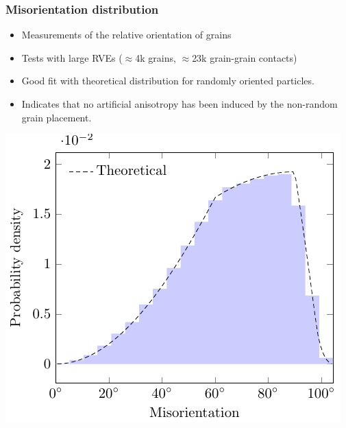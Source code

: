 \documentclass[11pt]{beamer} %
\begin{document}
\begin{frame}
 \frametitle{Misorientation distribution}
  \begin{itemize}
   \item Measurements of the relative orientation of grains
   \item Tests with large RVEs ($\approx$4k grains, $\approx$23k grain-grain contacts)
   \item Good fit with theoretical distribution for randomly oriented particles.
   \item Indicates that no artificial anisotropy has been induced by the non-random grain placement.
  \end{itemize}
  \begin{center}
   \includegraphics[scale=0.7]{WCResidualStress-figure1}
  \end{center}
\end{frame}
\end{document}
